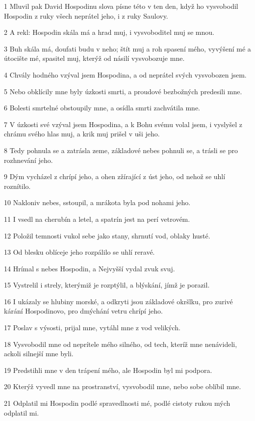 \par 1 Mluvil pak David Hospodinu slova písne této v ten den, když ho vysvobodil Hospodin z ruky všech neprátel jeho, i z ruky Saulovy.
\par 2 A rekl: Hospodin skála má a hrad muj, i vysvoboditel muj se mnou.
\par 3 Buh skála má, doufati budu v neho; štít muj a roh spasení mého, vyvýšení mé a útocište mé, spasitel muj, kterýž od násilí vysvobozuje mne.
\par 4 Chvály hodného vzýval jsem Hospodina, a od neprátel svých vysvobozen jsem.
\par 5 Nebo obklícily mne byly úzkosti smrti, a proudové bezbožných predesili mne.
\par 6 Bolesti smrtelné obstoupily mne, a osídla smrti zachvátila mne.
\par 7 V úzkosti své vzýval jsem Hospodina, a k Bohu svému volal jsem, i vyslyšel z chrámu svého hlas muj, a krik muj prišel v uši jeho.
\par 8 Tedy pohnula se a zatrásla zeme, základové nebes pohnuli se, a trásli se pro rozhnevání jeho.
\par 9 Dým vycházel z chrípí jeho, a ohen zžírající z úst jeho, od nehož se uhlí roznítilo.
\par 10 Nakloniv nebes, sstoupil, a mrákota byla pod nohami jeho.
\par 11 I vsedl na cherubín a letel, a spatrín jest na perí vetrovém.
\par 12 Položil temnosti vukol sebe jako stany, shrnutí vod, oblaky husté.
\par 13 Od blesku oblíceje jeho rozpálilo se uhlí reravé.
\par 14 Hrímal s nebes Hospodin, a Nejvyšší vydal zvuk svuj.
\par 15 Vystrelil i strely, kterýmiž je rozptýlil, a blýskání, jímž je porazil.
\par 16 I ukázaly se hlubiny morské, a odkryti jsou základové okršlku, pro zurivé kárání Hospodinovo, pro dmýchání vetru chrípí jeho.
\par 17 Poslav s výsosti, prijal mne, vytáhl mne z vod velikých.
\par 18 Vysvobodil mne od neprítele mého silného, od tech, kteríž mne nenávideli, ackoli silnejší mne byli.
\par 19 Predstihli mne v den trápení mého, ale Hospodin byl mi podpora.
\par 20 Kterýž vyvedl mne na prostranství, vysvobodil mne, nebo sobe oblíbil mne.
\par 21 Odplatil mi Hospodin podlé spravedlnosti mé, podlé cistoty rukou mých odplatil mi.
